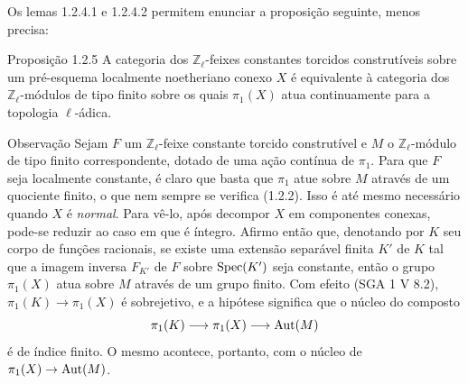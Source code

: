 Os lemas 1.2.4.1 e 1.2.4.2 permitem enunciar a proposição seguinte, menos precisa:

\begin{statement}{Proposição 1.2.5}
A categoria dos \(\mathbb Z_\ell\)-feixes constantes torcidos construtíveis sobre um pré-esquema localmente noetheriano conexo \(X\) é equivalente à categoria dos \(\mathbb Z_\ell\)-módulos de tipo finito sobre os quais \(\pi_1(X)\) atua continuamente para a topologia \(\ell\)-ádica.
\end{statement}

\begin{statement}{Observação}
Sejam \(F\) um \(\mathbb Z_\ell\)-feixe constante torcido construtível e \(M\) o \(\mathbb Z_\ell\)-módulo de tipo finito correspondente, dotado de uma ação contínua de \(\pi_1\). Para que \(F\) seja localmente constante, é claro que basta que \(\pi_1\) atue sobre \(M\) através de um quociente finito, o que nem sempre se verifica (1.2.2). Isso é até mesmo necessário quando \(X\) é \emph{normal}. Para vê-lo, após decompor \(X\) em componentes conexas, pode-se reduzir ao caso em que é íntegro. Afirmo então que, denotando por \(K\) seu corpo de funções racionais, se existe uma extensão separável finita \(K'\) de \(K\) tal que a imagem inversa \(F_{K'}\) de \(F\) sobre \(\operatorname{Spec}(K')\) seja constante, então o grupo \(\pi_1(X)\) atua sobre \(M\) através de um grupo finito. Com efeito (SGA 1 V 8.2), \(\pi_1(K)\to \pi_1(X)\) é sobrejetivo, e a hipótese significa que o núcleo do composto
\[
\pi_1(K)\longrightarrow \pi_1(X)\longrightarrow \operatorname{Aut}(M)
\]
é de índice finito. O mesmo acontece, portanto, com o núcleo de \(\pi_1(X)\to\operatorname{Aut}(M)\).
\end{statement}
